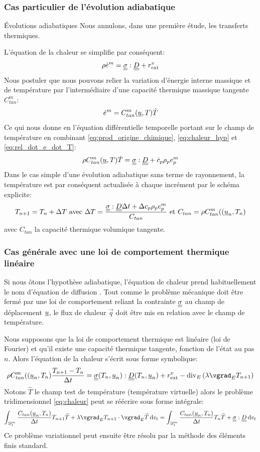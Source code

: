 \documentclass[10pt]{book}
\begin{document}
\subsubsection{Cas particulier de l'évolution adiabatique}
\begin{Hypothese}{Évolutions adiabatiques} Nous annulons, dans une première étude, les transferts thermiques.
\end{Hypothese}
L'équation de la chaleur se simplifie par conséquent:
\begin{equation}
\rho\dot{e}^{m}=\underline{\underline{\sigma}}:\underline{\underline{D}}+r^{v}_{\text{ext}}
\label{eq:chaleur_hyp}
\end{equation}
Nous postuler que nous pouvons relier la variation d'énergie interne massique et de température par l'intermédiaire d'une capacité thermique massique tangente $C^{m}_{tan}$:
\begin{equation}
\dot{e}^{m}=C^{m}_{tan}(\underline{u},T)\dot{T}
\label{eq:rel_dot_e_dot_T}
\end{equation}
Ce qui nous donne en l'équation différentielle temporelle portant sur le champ de température en combinant \eqref{eq:prod_origine_chimique}, \eqref{eq:chaleur_hyp} et \eqref{eq:rel_dot_e_dot_T}:
$$\rho C^{m}_{tan}(\underline{u},T)\dot{T} = \underline{\underline{\sigma}}:\underline{\underline{D}} +\dot{c}_{p}\rho_{p}e_{p}^{m}$$
Dans le cas simple d'une évolution adiabatique sans terme de rayonnement, la température est par conséquent actualisée à chaque incrément par le schéma explicite:
$$T_{n+1}=T_{n}+\Delta T \text{ avec } \Delta T =\dfrac{\underline{\underline{\sigma}}:\underline{\underline{D}}\Delta t+\Delta c_{p}\rho_{p}e_{p}^{m}}{C_{tan}} \text{ et } C_{tan}=\rho C^{m}_{tan}((\underline{u}_{n},T_{n})$$
avec $C_{tan}$ la capacité thermique volumique tangente.
\subsubsection{Cas générale avec une loi de comportement thermique linéaire}
Si nous ôtons l'hypothèse adiabatique, l'équation de chaleur prend habituellement le nom d'\og équation de diffusion \fg{}. Tout comme le problème mécanique doit être fermé par une loi de comportement reliant la contrainte $\underline{\underline{\sigma}}$ au champ de déplacement $\underline{u}$, le flux de chaleur $\vec{q}$ doit être mis en relation avec le champ de température.

Nous supposons que la loi de comportement thermique est linéaire (loi de Fourier) et qu'il existe une capacité thermique tangente, fonction de l'état au pas $n$. Alors l'équation de la chaleur s'écrit sous forme symbolique:
\begin{equation}
\rho C^{m}_{tan}((\Dep_{n},T_{n})\dfrac{T_{n+1}-T_{n}}{\Delta t}=\SC(T_{n},\Dep_{n}):\TD(T_{n},\Dep_{n})+\PCaloVol-\div_{E}\left(\lambda\vgrad_{E} T_{n+1}\right)
\label{eq:chaleur}
\end{equation}
Notons $\hat{T}$ le champ test de température (température virtuelle) alors le problème tridimensionnel \eqref{eq:chaleur} peut se réécrire sous forme intégrale:
$$\int_{\Dmt}\dfrac{C_{tan}(\Dep_{n},T_{n})}{\Delta t}T_{n+1}\hat{T}+\lambda \vgrad_{E}T_{n+1}\cdot\vgrad_{E}\hat{T}\dvt=\int_{\Dmt}\dfrac{C_{tan}(\Dep_{n},T_{n})}{\Delta t}T_{n}\hat{T}+\SC:\TD \dvt$$
Ce problème variationnel peut ensuite être résolu par la méthode des éléments finis standard.
\end{document}
